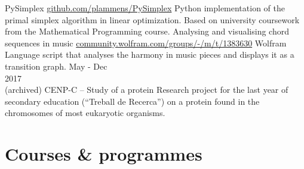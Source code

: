 \documentclass[]{resume}
\begin{document}
\begin{adjustwidth}{10pt}{10pt}
\renewcommand{\twentylen}{\itemwidth}
\begin{twenty}[\chronowidth]
      {PySimplex}
      {\href{https://github.com/plammens/PySimplex}{github.com/plammens/PySimplex}}
      {Python implementation of the primal simplex algorithm in linear optimization. Based on university coursework from the Mathematical Programming course.}
      {Analysing and visualising chord sequences in music}
      {\href{https://community.wolfram.com/groups/-/m/t/1383630}{community.wolfram.com/groups/-/m/t/1383630}}
      {Wolfram Language script that analyses the harmony in music pieces and displays it as a transition graph.}
  \twentyitem
      {May - Dec \\ 2017 \\ (archived)}
      {CENP-C – Study of a protein}
      {}
      {Research project for the last year of secondary education (“Treball de Recerca”) on a protein found in the chromosomes of most eukaryotic organisms.}
\end{twenty}



\section*{Courses \& programmes}


\end{adjustwidth}
\end{document}

